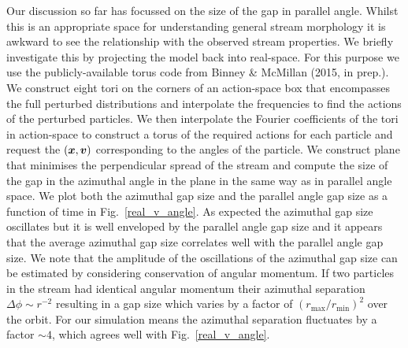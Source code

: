 \documentclass[useAMS,usenatbib,fleqn,a4paper]{mn2e}
\newcommand{\bs}[1]{\bmath{#1}}
\begin{document}
Our discussion so far has focussed on the size of the gap in parallel angle. Whilst this is an appropriate space for understanding general stream morphology it is awkward to see the relationship with the observed stream properties. We briefly investigate this by projecting the model back into real-space. For this purpose we use the publicly-available torus code from Binney \& McMillan (2015, in prep.). We construct eight tori on the corners of an action-space box that encompasses the full perturbed distributions and interpolate the frequencies to find the actions of the perturbed particles. We then interpolate the Fourier coefficients of the tori in action-space to construct a torus of the required actions for each particle and request the $(\bs{x},\bs{v})$ corresponding to the angles of the particle. We construct plane that minimises the perpendicular spread of the stream and compute the size of the gap in the azimuthal angle in the plane in the same way as in parallel angle space. We plot both the azimuthal gap size and the parallel angle gap size as a function of time in Fig.~\ref{real_v_angle}. As expected the azimuthal gap size oscillates but it is well enveloped by the parallel angle gap size and it appears that the average azimuthal gap size correlates well with the parallel angle gap size. We note that the amplitude of the oscillations of the azimuthal gap size can be estimated by considering conservation of angular momentum. If two particles in the stream had identical angular momentum their azimuthal separation $\Delta\phi\sim r^{-2}$ resulting in a gap size which varies by a factor of $(r_\mathrm{max}/r_\mathrm{min})^2$ over the orbit. For our simulation means the azimuthal separation fluctuates by a factor $\sim 4$, which agrees well with Fig.~\ref{real_v_angle}.
\end{document}
